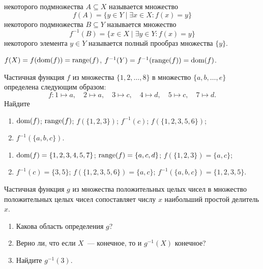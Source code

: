 \begin{definition}
     некоторого подмножества $ A \subseteq X $ называется множество
    \[
        f(A) = \{ y \in Y \mid \exists x \in X: f(x) = y \}
    \]
     некоторого подмножества $ B \subseteq Y $ называется множество
    \[
        f^{-1}(B) = \{ x \in X \mid \exists y \in Y: f(x) = y \}
    \]
     некоторого элемента $ y \in Y $ называется полный прообраз множества $ \{ y \} $.
\end{definition}

\begin{remark}
    $ f(X) = f(\operatorname*{\textnormal{dom}}(f)) = \operatorname*{\textnormal{range}}(f) $, $ f^{-1}(Y) = f^{-1}(\operatorname*{\textnormal{range}}(f)) = \operatorname*{\textnormal{dom}}(f) $.
\end{remark}


\begin{Exercise}[counter=SecExercise, label={exercise:functions:sets_examples}]
    \noindent
    Частичная функция $ f $ из множества $ \{1, 2, \ldots, 8 \} $ в множество $ \{a, b, \ldots, e \} $ определена следующим образом:
    \[
        f: 1 \mapsto a, \quad 2 \mapsto a, \quad 3 \mapsto c, \quad 4 \mapsto d, \quad 5 \mapsto c, \quad 7 \mapsto d.
    \]
    Найдите
    \begin{enumerate}[label=\textbf{\alph*)}]
        \item $ \operatorname*{\textnormal{dom}}(f) $;
        \inlineitem $ \operatorname*{\textnormal{range}}(f) $;
        \inlineitem $ f(\{1, 2, 3\}) $;
        \inlineitem $ f^{-1}(c) $;
        \inlineitem $ f(\{1, 2, 3, 5, 6\}) $;
        \item $ f^{-1}(\{a, b, c\}) $.
    \end{enumerate}
\end{Exercise}

\begin{Answer}
    \noindent
    \begin{enumerate}[label=\textbf{\alph*)}]
        \item $ \operatorname*{\textnormal{dom}}(f) = \{1, 2, 3, 4, 5, 7\} $;
        \inlineitem $ \operatorname*{\textnormal{range}}(f) = \{a, c, d\} $;
        \inlineitem $ f(\{1, 2, 3\}) = \{a, c\} $;
        \item $ f^{-1}(c) = \{3, 5\} $;
        \inlineitem $ f(\{1, 2, 3, 5, 6\}) = \{a, c\} $;
        \inlineitem $ f^{-1}(\{a, b, c\}) = \{1, 2, 3, 5\} $.
    \end{enumerate}
\end{Answer}


\begin{Exercise}[counter=SecExercise, label={exercise:functions:max_prime_devisor}]
    \noindent
    Частичная функция $ g $ из множества положительных целых чисел в множество положительных целых чисел
    сопоставляет числу $ x $ наибольший простой делитель $ x $.
    \begin{enumerate}[label=\textbf{\alph*)}]
        \item Какова область определения $ g $?
        \item Верно ли, что если $ X $~--- конечное, то и $ g^{-1}(X) $ конечное?
        \item Найдите $ g^{-1}(3) $.
    \end{enumerate}
\end{Exercise}

